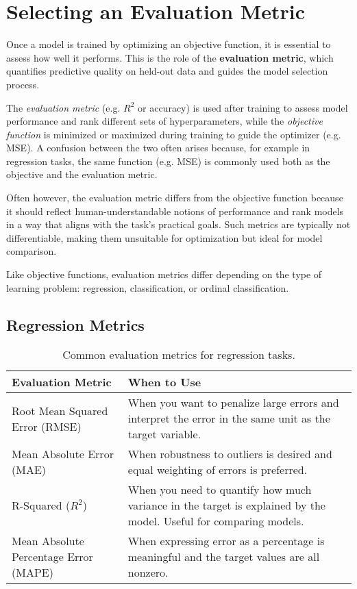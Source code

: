 \documentclass[12pt,openany]{book}
\begin{document}
\section{Selecting an Evaluation Metric}

Once a model is trained by optimizing an objective function, it is 
essential to assess how well it performs. This is the role of the 
\textbf{evaluation metric}, which quantifies predictive quality on 
held-out data and guides the model selection process.

\begin{notebox}
The \textit{evaluation metric} 
(e.g. $R^2$ or accuracy) is used after training to assess model performance 
and rank different sets of hyperparameters, while the \textit{objective function} is minimized or maximized during training to guide the optimizer (e.g. MSE). A confusion between the two 
often arises because, for example in regression tasks, the same function (e.g. MSE) is commonly used both as the objective and the evaluation metric.
\end{notebox}

Often however, the evaluation metric differs from the objective function 
because it should reflect human-understandable notions of performance 
and rank models in a way that aligns with the task’s practical goals. 
Such metrics are typically not differentiable, making them unsuitable 
for optimization but ideal for model comparison.
\newline

Like objective functions, evaluation metrics differ depending on the 
type of learning problem: regression, classification, or ordinal 
classification.

\subsection{Regression Metrics}

\begin{table}[H]
    \centering
    \small
    \renewcommand{\arraystretch}{1.3}
    \begin{tabular}{|l|p{9cm}|}
        \hline
        \textbf{Evaluation Metric} & \textbf{When to Use} \\
        \hline
        Root Mean Squared Error (RMSE) & When you want to penalize large errors and interpret the error in the same unit as the target variable. \\
        \hline
        Mean Absolute Error (MAE) & When robustness to outliers is desired and equal weighting of errors is preferred. \\
        \hline
        R-Squared (\( R^2 \)) & When you need to quantify how much variance in the target is explained by the model. Useful for comparing models. \\
        \hline
        Mean Absolute Percentage Error (MAPE) & When expressing error as a percentage is meaningful and the target values are all nonzero. \\
        \hline
    \end{tabular}
    \caption{Common evaluation metrics for regression tasks.}
\end{table}
\end{document}
